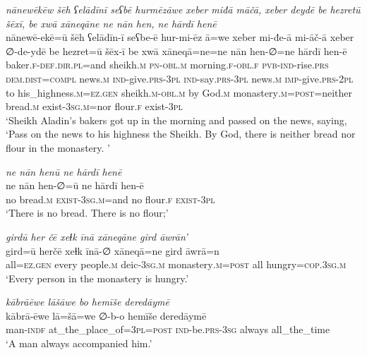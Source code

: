 \ea \label{HB.2}
\textit{nānewēkēw šēh ʕelādīnī seʕbē hurmēzāwe xeber miđā māčā, xeber deydē be hezretū šēxī, be xwā xāneqāne ne nān hen, ne hārdī henē} \\ 
\gll nānewē-ekē=ū šēh ʕelādīn-ī seʕbe-ē hur-mi-ēz ā=we xeber mi-đe-ā mi-āč-ā xeber ∅-de-ydē be hezret=ū šēx-ī be xwā xāneqā=ne=ne nān hen-∅=ne hārdī hen-ē \\ 
 baker\textsc{\textsc{.f}}\textsc{-def}\textsc{.dir}\textsc{.pl}=and sheikh\textsc{.m} \textsc{pn}\textsc{-obl}\textsc{.m} morning\textsc{\textsc{.f}}\textsc{-obl}\textsc{\textsc{.f}} \textsc{pvb-}\textsc{ind-}rise\textsc{.prs} \textsc{dem.dist}\textsc{=compl} news\textsc{.m} \textsc{ind-}give\textsc{.prs}\textsc{-3pl} \textsc{ind-}say\textsc{.prs}\textsc{-3pl} news\textsc{.m} \textsc{imp-}give\textsc{.prs}\textsc{-2pl} to his\_highness\textsc{.m}\textsc{=ez}\textsc{.gen} sheikh\textsc{.m}\textsc{-obl}\textsc{.m} by God\textsc{.m} monastery\textsc{.m}\textsc{=\textsc{post}}=neither bread\textsc{.m} exist\textsc{-3sg}\textsc{.m}=nor flour\textsc{\textsc{.f}} exist\textsc{-3pl} \\ 
\glt `Sheikh Aladin’s bakers got up in the morning and passed on the news, saying, ‘Pass on the news to his highness the Sheikh. By God, there is neither bread nor flour in the monastery. '
\z 
 
\ea \label{HB.3}
\textit{ne nān henū ne hārdī henē} \\ 
\gll ne nān hen-∅=ū ne hārdī hen-ē \\ 
 no bread\textsc{.m} \textsc{exist}\textsc{-3sg}\textsc{.m}=and no flour\textsc{\textsc{.f}} \textsc{exist}\textsc{-3pl} \\ 
\glt `There is no bread. There is no flour;'
\z 
 
\ea \label{HB.5}
\textit{girdū her čē xeɫk īnā xāneqāne gird āwrān’} \\ 
\gll gird=ū herčē xeɫk īnā-∅ xāneqā=ne gird āwrā=n \\ 
 all\textsc{=ez}\textsc{.gen} every people\textsc{.m} deic\textsc{-3sg}\textsc{.m} monastery\textsc{.m}\textsc{=\textsc{post}} all hungry\textsc{=cop}\textsc{.3sg}\textsc{.m} \\ 
\glt `Every person in the monastery is hungry.'
\z 
 
\ea \label{HB.7}
\textit{kābrāēwe lāšāwe bo hemīše deredāymē} \\ 
\gll kābrā-ēwe lā=šā=we ∅-b-o hemīše deredāymē \\ 
 man\textsc{-indf} at\_the\_place\_of\textsc{=3pl}\textsc{=\textsc{post}} \textsc{ind-}be\textsc{.prs}\textsc{-3sg} always all\_the\_time \\ 
\glt `A man always accompanied him.'
\z 
 
